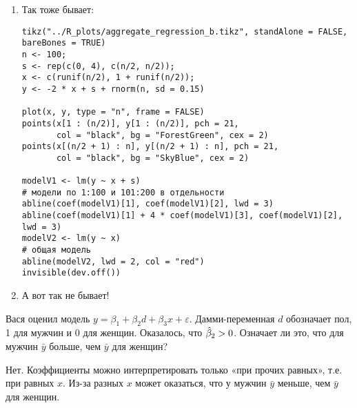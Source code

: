 \begin{problem}
\begin{sol}
\begin{enumerate}
\item Так тоже бывает:

\begin{verbatim}
tikz("../R_plots/aggregate_regression_b.tikz", standAlone = FALSE, bareBones = TRUE)
n <- 100;
s <- rep(c(0, 4), c(n/2, n/2));
x <- c(runif(n/2), 1 + runif(n/2));
y <- -2 * x + s + rnorm(n, sd = 0.15)

plot(x, y, type = "n", frame = FALSE)
points(x[1 : (n/2)], y[1 : (n/2)], pch = 21,
       col = "black", bg = "ForestGreen", cex = 2)
points(x[(n/2 + 1) : n], y[(n/2 + 1) : n], pch = 21,
       col = "black", bg = "SkyBlue", cex = 2)

modelV1 <- lm(y ~ x + s)
# модели по 1:100 и 101:200 в отдельности
abline(coef(modelV1)[1], coef(modelV1)[2], lwd = 3)
abline(coef(modelV1)[1] + 4 * coef(modelV1)[3], coef(modelV1)[2], lwd = 3)
modelV2 <- lm(y ~ x)
# общая модель
abline(modelV2, lwd = 2, col = "red")
invisible(dev.off())
\end{verbatim}

\begin{minipage}{0.6\textwidth}
\begin{center}
\begin{tikzpicture}[scale = 0.025]

\end{tikzpicture}
\end{center}
\end{minipage}

\item А вот так не бывает!
\end{enumerate}
\end{sol}
\end{problem}




\begin{problem} %
Вася оценил модель $y=\beta_1+\beta_2 d+\beta_3 x+\varepsilon$. Дамми-переменная $d$ обозначает пол, 1 для мужчин и 0 для женщин. Оказалось, что $\hb_2>0$. Означает ли это, что для мужчин $\bar{y}$ больше, чем $\bar{y}$ для женщин?


\begin{sol}
Нет. Коэффициенты можно интерпретировать только «при прочих равных», т.е. при равных $x$. Из-за разных $x$ может оказаться, что у мужчин $\bar{y}$ меньше, чем $\bar{y}$ для женщин.
\end{sol}
\end{problem}




